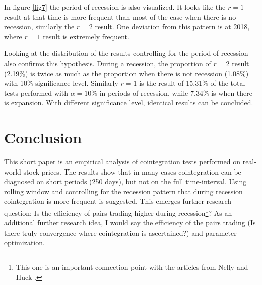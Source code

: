 \documentclass[12pt, a4paper, twoside, titlepage]{article}
\begin{document}
In figure \ref{fig7} the period of recession is also visualized. It looks like the $r = 1$ result at that time is more frequent than most of the case when there is no recession, similarly the $r = 2$ result. One deviation from this pattern is at 2018, where $r = 1$ result is extremely frequent.

Looking at the distribution of the results controlling for the period of recession also confirms this hypothesis. During a recession, the proportion of $r = 2$ result (2.19\%) is twice as much as the proportion when there is not recession (1.08\%) with 10\% significance level. Similarly $r = 1$ is the result of 15.31\% of the total tests performed with $\alpha = 10\%$ in periods of recession, while 7.34\% is when there is expansion. With different significance level, identical results can be concluded.

\section{Conclusion}

This short paper is an empirical analysis of cointegration tests performed on real-world stock prices. The results show that in many cases cointegration can be diagnosed on short periods (250 days), but not on the full time-interval. Using rolling window and controlling for the recession pattern that during recession cointegration is more frequent is suggested. This emerges further research question: Is the efficiency of pairs trading higher during recession\footnote{This one is an important connection point with the articles from Nelly \cite{Neely.2014} and Huck \cite{Huck.2014}.}? As an additional further research idea, I would say the efficiency of the pairs trading (Is there truly convergence where cointegration is ascertained?) and parameter optimization.


\begin{appendix}
  \listoffigures
\end{appendix}



\end{document}
